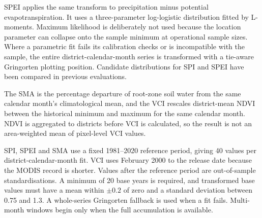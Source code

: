 \documentclass[10pt,a4paper]{article}
\begin{document}
SPEI applies the same transform to precipitation minus potential evapotranspiration. It uses a three-parameter log-logistic distribution fitted by L-moments\citep{VicenteSerrano2010,Begueria2014,Hosking1990}. Maximum likelihood is deliberately not used because the location parameter can collapse onto the sample minimum at operational sample sizes. Where a parametric fit fails its calibration checks or is incompatible with the sample, the entire district-calendar-month series is transformed with a tie-aware Gringorten plotting position\citep{Gringorten1963}. Candidate distributions for SPI and SPEI have been compared in previous evaluations\citep{Stagge2015}.

The SMA is the percentage departure of root-zone soil water from the same calendar month's climatological mean, and the VCI rescales district-mean NDVI between the historical minimum and maximum for the same calendar month\citep{Kogan1995}. NDVI is aggregated to districts before VCI is calculated, so the result is not an area-weighted mean of pixel-level VCI values.

SPI, SPEI and SMA use a fixed 1981--2020 reference period, giving 40 values per district-calendar-month fit. VCI uses February 2000 to the release date because the MODIS record is shorter. Values after the reference period are out-of-sample standardisations. A minimum of 20 base years is required, and transformed base values must have a mean within $\pm0.2$ of zero and a standard deviation between 0.75 and 1.3. A whole-series Gringorten fallback is used when a fit fails. Multi-month windows begin only when the full accumulation is available.
\end{document}
